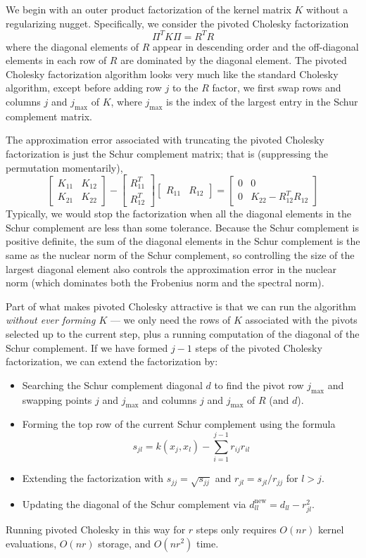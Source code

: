 \documentclass[12pt, leqno]{article} %
\begin{document}
We begin with an outer product factorization of the kernel matrix $K$
without a regularizing nugget.  Specifically, we consider
the pivoted Cholesky factorization
\[
  \Pi^T K \Pi = R^T R
\]
where the diagonal elements of $R$ appear in descending order and
the off-diagonal elements in each row of $R$ are dominated by the
diagonal element.  The pivoted Cholesky factorization algorithm looks
very much like the standard Cholesky algorithm, except before adding
row $j$ to the $R$ factor, we first swap rows and columns $j$ and
$j_{\max}$ of $K$, where $j_{\max}$ is the index of the largest entry
in the Schur complement matrix.

The approximation error associated with truncating the pivoted
Cholesky factorization is just the Schur complement matrix;
that is (suppressing the permutation momentarily),
\[
  \begin{bmatrix} K_{11} & K_{12} \\ K_{21} & K_{22} \end{bmatrix} -
  \begin{bmatrix} R_{11}^T \\ R_{12}^T \end{bmatrix}
  \begin{bmatrix} R_{11} & R_{12} \end{bmatrix} =
  \begin{bmatrix} 0 & 0 \\ 0 & K_{22} - R_{12}^T R_{12} \end{bmatrix}
\]
Typically, we would stop the
factorization when all the diagonal elements in the Schur
complement are less than some tolerance.  Because the Schur complement
is positive definite, the sum of the diagonal elements in the Schur
complement is the same as the nuclear norm of the Schur complement,
so controlling the size of the largest diagonal element also controls
the approximation error in the nuclear norm (which dominates both the
Frobenius norm and the spectral norm).

Part of what makes pivoted Cholesky attractive is that we can run
the algorithm {\em without ever forming $K$} --- we only need the rows
of $K$ associated with the pivots selected up to the current step,
plus a running computation of the diagonal of the Schur complement.
If we have formed $j-1$ steps of the pivoted Cholesky factorization,
we can extend the factorization by:
\begin{itemize}
\item Searching the Schur complement diagonal $d$ to find
  the pivot row $j_{\max}$ and swapping points $j$ and
  $j_{\max}$ and columns $j$ and $j_{\max}$ of $R$ (and $d$).
\item Forming the top row of the current Schur complement using the formula
  \[
    s_{jl} = k(x_j, x_l) - \sum_{i=1}^{j-1} r_{ij} r_{il}
  \]
\item Extending the factorization with $s_{jj} = \sqrt{s_{jj}}$ and 
  $r_{jl} = s_{jl} / r_{jj}$ for $l > j$.
\item Updating the diagonal of the Schur complement via
  $d_{ll}^{\mathrm{new}} = d_{ll} - r_{jl}^2$.
\end{itemize}
Running pivoted Cholesky in this way for $r$ steps only requires
$O(nr)$ kernel evaluations, $O(nr)$ storage, and $O(nr^2)$ time.
\end{document}
